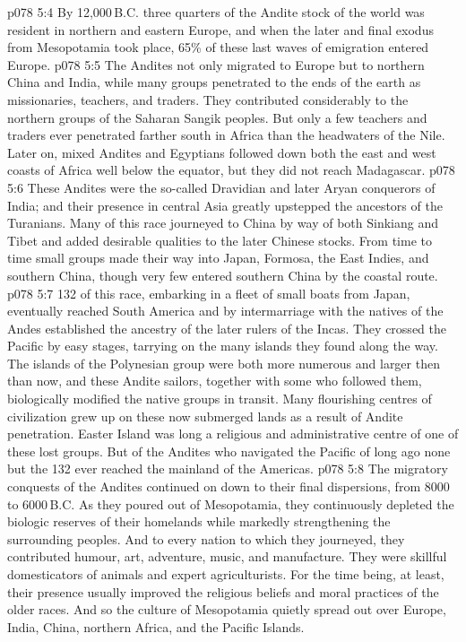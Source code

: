 \vs p078 5:4 \pc By 12,000\,B.C. three quarters of the Andite stock of the world was resident in northern and eastern Europe, and when the later and final exodus from Mesopotamia took place, 65\% of these last waves of emigration entered Europe.
\vs p078 5:5 \pc The Andites not only migrated to Europe but to northern China and India, while many groups penetrated to the ends of the earth as missionaries, teachers, and traders. They contributed considerably to the northern groups of the Saharan Sangik peoples. But only a few teachers and traders ever penetrated farther south in Africa than the headwaters of the Nile. Later on, mixed Andites and Egyptians followed down both the east and west coasts of Africa well below the equator, but they did not reach Madagascar.
\vs p078 5:6 These Andites were the so\hyp{}called Dravidian and later Aryan conquerors of India; and their presence in central Asia greatly upstepped the ancestors of the Turanians. Many of this race journeyed to China by way of both Sinkiang and Tibet and added desirable qualities to the later Chinese stocks. From time to time small groups made their way into Japan, Formosa, the East Indies, and southern China, though very few entered southern China by the coastal route.
\vs p078 5:7 132 of this race, embarking in a fleet of small boats from Japan, eventually reached South America and by intermarriage with the natives of the Andes established the ancestry of the later rulers of the Incas. They crossed the Pacific by easy stages, tarrying on the many islands they found along the way. The islands of the Polynesian group were both more numerous and larger then than now, and these Andite sailors, together with some who followed them, biologically modified the native groups in transit. Many flourishing centres of civilization grew up on these now submerged lands as a result of Andite penetration. Easter Island was long a religious and administrative centre of one of these lost groups. But of the Andites who navigated the Pacific of long ago none but the 132 ever reached the mainland of the Americas.
\vs p078 5:8 \pc The migratory conquests of the Andites continued on down to their final dispersions, from 8000 to 6000\,B.C. As they poured out of Mesopotamia, they continuously depleted the biologic reserves of their homelands while markedly strengthening the surrounding peoples. And to every nation to which they journeyed, they contributed humour, art, adventure, music, and manufacture. They were skillful domesticators of animals and expert agriculturists. For the time being, at least, their presence usually improved the religious beliefs and moral practices of the older races. And so the culture of Mesopotamia quietly spread out over Europe, India, China, northern Africa, and the Pacific Islands.
